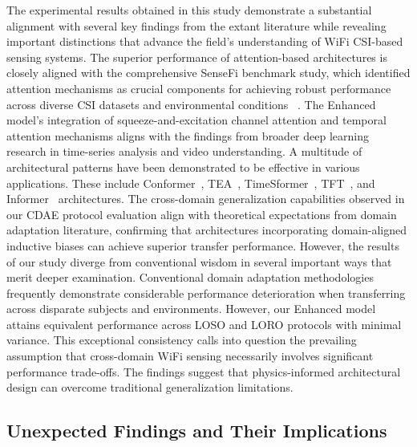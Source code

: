 \documentclass[journal]{IEEEtran}
\begin{document}
The experimental results obtained in this study demonstrate a substantial alignment with several key findings from the extant literature while revealing important distinctions that advance the field's understanding of WiFi CSI-based sensing systems. The superior performance of attention-based architectures is closely aligned with the comprehensive SenseFi benchmark study, which identified attention mechanisms as crucial components for achieving robust performance across diverse CSI datasets and environmental conditions ~\cite{yang2023sensefi}.
The Enhanced model's integration of squeeze-and-excitation channel attention and temporal attention mechanisms aligns with the findings from broader deep learning research in time-series analysis and video understanding. A multitude of architectural patterns have been demonstrated to be effective in various applications. These include Conformer~\cite{gulati2020conformer}, TEA~\cite{li2020tea}, TimeSformer~\cite{bertasius2021timesformer}, TFT~\cite{lim2021tft}, and Informer~\cite{zhou2021informer} architectures. The cross-domain generalization capabilities observed in our CDAE protocol evaluation align with theoretical expectations from domain adaptation literature, confirming that architectures incorporating domain-aligned inductive biases can achieve superior transfer performance. However, the results of our study diverge from conventional wisdom in several important ways that merit deeper examination. 
Conventional domain adaptation methodologies frequently demonstrate considerable performance deterioration when transferring across disparate subjects and environments. However, our Enhanced model attains equivalent performance across LOSO and LORO protocols with minimal variance. This exceptional consistency calls into question the prevailing assumption that cross-domain WiFi sensing necessarily involves significant performance trade-offs. The findings suggest that physics-informed architectural design can overcome traditional generalization limitations.


\subsection{Unexpected Findings and Their Implications}
\end{document}

